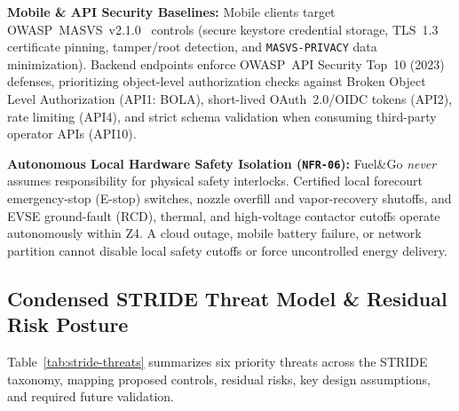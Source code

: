 \textbf{Mobile \& API Security Baselines:} Mobile clients target OWASP~MASVS~v2.1.0~\cite{owasp2024masvs} controls (secure keystore credential storage, TLS~1.3 certificate pinning, tamper/root detection, and \texttt{MASVS-PRIVACY} data minimization). Backend endpoints enforce OWASP~API Security Top~10 (2023)~\cite{owasp2023apitop10} defenses, prioritizing object-level authorization checks against Broken Object Level Authorization (API1: BOLA), short-lived OAuth~2.0/OIDC tokens (API2), rate limiting (API4), and strict schema validation when consuming third-party operator APIs (API10).

\textbf{Autonomous Local Hardware Safety Isolation (\texttt{NFR-06}):} Fuel\&Go \emph{never} assumes responsibility for physical safety interlocks. Certified local forecourt emergency-stop (E-stop) switches, nozzle overfill and vapor-recovery shutoffs, and EVSE ground-fault (RCD), thermal, and high-voltage contactor cutoffs operate autonomously within Z4. A cloud outage, mobile battery failure, or network partition cannot disable local safety cutoffs or force uncontrolled energy delivery.

\subsection{Condensed STRIDE Threat Model \& Residual Risk Posture}
Table~\ref{tab:stride-threats} summarizes six priority threats across the STRIDE taxonomy, mapping proposed controls, residual risks, key design assumptions, and required future validation.

